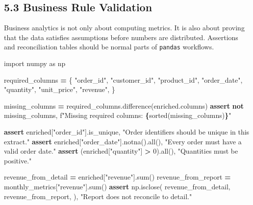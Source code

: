 \documentclass[
  12pt,
]{article}
\newenvironment{Shaded}{\begin{snugshade}}{\end{snugshade}}
\newcommand{\BuiltInTok}[1]{#1}
\newcommand{\ControlFlowTok}[1]{\textcolor[rgb]{0.13,0.29,0.53}{\textbf{#1}}}
\newcommand{\DecValTok}[1]{\textcolor[rgb]{0.00,0.00,0.81}{#1}}
\newcommand{\ImportTok}[1]{#1}
\newcommand{\KeywordTok}[1]{\textcolor[rgb]{0.13,0.29,0.53}{\textbf{#1}}}
\newcommand{\NormalTok}[1]{#1}
\newcommand{\OperatorTok}[1]{\textcolor[rgb]{0.81,0.36,0.00}{\textbf{#1}}}
\newcommand{\SpecialCharTok}[1]{\textcolor[rgb]{0.81,0.36,0.00}{\textbf{#1}}}
\newcommand{\SpecialStringTok}[1]{\textcolor[rgb]{0.31,0.60,0.02}{#1}}
\newcommand{\StringTok}[1]{\textcolor[rgb]{0.31,0.60,0.02}{#1}}
\begin{document}
\subsection{5.3 Business Rule
Validation}\label{business-rule-validation}

Business analytics is not only about computing metrics. It is also about
proving that the data satisfies assumptions before numbers are
distributed. Assertions and reconciliation tables should be normal parts
of \texttt{pandas} workflows.

\begin{Shaded}
\begin{Highlighting}[]
\ImportTok{import}\NormalTok{ numpy }\ImportTok{as}\NormalTok{ np}

\NormalTok{required\_columns }\OperatorTok{=}\NormalTok{ \{}
    \StringTok{"order\_id"}\NormalTok{, }\StringTok{"customer\_id"}\NormalTok{, }\StringTok{"product\_id"}\NormalTok{, }\StringTok{"order\_date"}\NormalTok{,}
    \StringTok{"quantity"}\NormalTok{, }\StringTok{"unit\_price"}\NormalTok{, }\StringTok{"revenue"}\NormalTok{,}
\NormalTok{\}}

\NormalTok{missing\_columns }\OperatorTok{=}\NormalTok{ required\_columns.difference(enriched.columns)}
\ControlFlowTok{assert} \KeywordTok{not}\NormalTok{ missing\_columns, }\SpecialStringTok{f"Missing required columns: }\SpecialCharTok{\{}\BuiltInTok{sorted}\NormalTok{(missing\_columns)}\SpecialCharTok{\}}\SpecialStringTok{"}

\ControlFlowTok{assert}\NormalTok{ enriched[}\StringTok{"order\_id"}\NormalTok{].is\_unique, }\StringTok{"Order identifiers should be unique in this extract."}
\ControlFlowTok{assert}\NormalTok{ enriched[}\StringTok{"order\_date"}\NormalTok{].notna().}\BuiltInTok{all}\NormalTok{(), }\StringTok{"Every order must have a valid order date."}
\ControlFlowTok{assert}\NormalTok{ (enriched[}\StringTok{"quantity"}\NormalTok{] }\OperatorTok{\textgreater{}} \DecValTok{0}\NormalTok{).}\BuiltInTok{all}\NormalTok{(), }\StringTok{"Quantities must be positive."}

\NormalTok{revenue\_from\_detail }\OperatorTok{=}\NormalTok{ enriched[}\StringTok{"revenue"}\NormalTok{].}\BuiltInTok{sum}\NormalTok{()}
\NormalTok{revenue\_from\_report }\OperatorTok{=}\NormalTok{ monthly\_metrics[}\StringTok{"revenue"}\NormalTok{].}\BuiltInTok{sum}\NormalTok{()}
\ControlFlowTok{assert}\NormalTok{ np.isclose(}
\NormalTok{    revenue\_from\_detail,}
\NormalTok{    revenue\_from\_report,}
\NormalTok{), }\StringTok{"Report does not reconcile to detail."}


\end{Highlighting}
\end{Shaded}
\end{document}
